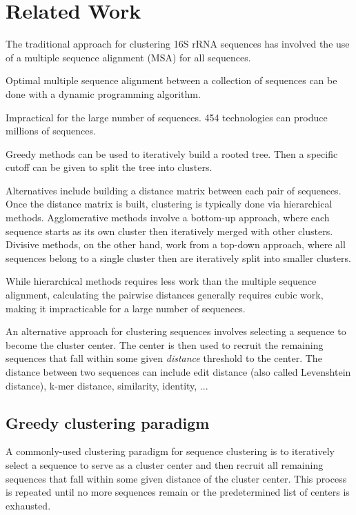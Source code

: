 \section{Related Work}

The traditional approach for clustering 16S rRNA sequences has involved the use of a multiple sequence alignment (MSA) for all sequences.

Optimal multiple sequence alignment between a collection of sequences can be done with a dynamic programming algorithm.

Impractical for the large number of sequences.
454 technologies can produce millions of sequences.

Greedy methods can be used to iteratively build a rooted tree.
Then a specific cutoff can be given to split the tree into clusters.

Alternatives include building a distance matrix between each pair of sequences.  
Once the distance matrix is built, clustering is typically done via hierarchical methods.
Agglomerative methods involve a bottom-up approach, where each sequence starts as its own cluster then iteratively merged with other clusters.
Divisive methods, on the other hand, work from a top-down approach, where all sequences belong to a single cluster then are iteratively split into smaller clusters.

While hierarchical methods requires less work than the multiple sequence alignment, calculating the pairwise distances generally requires cubic work, making it impracticable for a large number of sequences.

An alternative approach for clustering sequences involves selecting a sequence to become the cluster center.
The center is then used to recruit the remaining sequences that fall within some given \emph{distance} threshold to the center.
The distance between two sequences can include edit distance (also called Levenshtein distance), k-mer distance, similarity, identity, ...

\subsection{Greedy clustering paradigm}

A commonly-used clustering paradigm for sequence clustering is to iteratively select a sequence to serve as a cluster center and then recruit all remaining sequences that fall within some given distance of the cluster center.
This process is repeated until no more sequences remain or the predetermined list of centers is exhausted.


